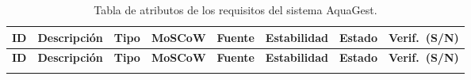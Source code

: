 \documentclass[11pt,a4paper]{article}
\renewcommand{\_}{\textunderscore\allowbreak}
\begin{document}
\begin{landscape}
\renewcommand{\arraystretch}{1.2}

\begin{longtable}{|p{1.3cm}|p{6.0cm}|p{1.1cm}|p{1.9cm}|p{2.3cm}|p{2.2cm}|p{1.9cm}|p{1.7cm}|}
\caption{Tabla de atributos de los requisitos del sistema AquaGest.}
\label{tab:atributos}\\
\hline
\textbf{ID} & \textbf{Descripción} & \textbf{Tipo} & \textbf{MoSCoW} & \textbf{Fuente} & \textbf{Estabilidad} & \textbf{Estado} & \textbf{Verif.\ (S/N)}\\
\hline
\endfirsthead

\hline
\textbf{ID} & \textbf{Descripción} & \textbf{Tipo} & \textbf{MoSCoW} & \textbf{Fuente} & \textbf{Estabilidad} & \textbf{Estado} & \textbf{Verif.\ (S/N)}\\
\hline
\endhead

\hline
\endfoot

\hline
\endlastfoot


\end{longtable}
\end{landscape}
\end{document}
